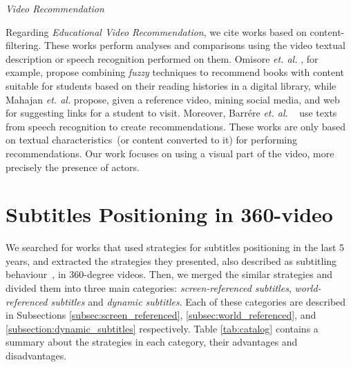 \emph{Video Recommendation} 

Regarding \textit{Educational Video Recommendation}, we cite works based on content-filtering.
These works perform analyses and comparisons using the video textual description or speech recognition performed on them. Omisore \textit{et. al.} \cite{omisore2014personalized}, for example, propose combining \textit{fuzzy} techniques to recommend books with content suitable for students based on their reading histories in a digital library, while Mahajan \textit{et. al.} \cite{mahajan2015optimising} propose, given a reference video,  mining social media, and web for suggesting links for a student to visit.
Moreover, Barrére \textit{et. al.}
~\cite{barrere2020utilizaccao} use texts from speech recognition to create recommendations.
These works are only based on textual characteristics~(or content converted to it) for performing recommendations.
Our work focuses on using a visual part of the video, more precisely the presence of actors.


\section{Subtitles Positioning in 360-video}
\label{sec:subtitles}

We searched for works that used strategies for subtitles positioning in the last 5 years, and extracted the strategies they presented, also described as subtitling behaviour~\cite{brown_subtitles_2017}, in 360-degree videos. Then, we merged the similar strategies and divided them into three main categories: \emph{screen-referenced subtitles}, \emph{world-referenced subtitles} and \emph{dynamic subtitles}. Each of these categories are described in Subsections \ref{subsec:screen_referenced}, \ref{subsec:world_referenced}, and \ref{subsection:dynamic_subtitles} respectively. Table \ref{tab:catalog} contains a summary about the strategies in each category, their advantages and disadvantages.

